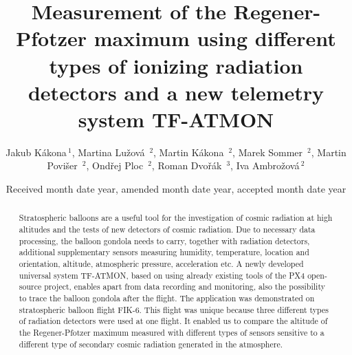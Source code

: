 \documentclass{Rpd}
\begin{document}

\def\copyrightyear{2021}%

\title[TF-ATMON ionizing radiation measurement]{Measurement of the Regener-Pfotzer maximum using different types of ionizing radiation detectors and a new telemetry system TF-ATMON}
\author[Kakona J. \textit{et~al}]{Jakub Kákona\,$^{ 1}$,  Martina Lužová \,$^{ 2}$, Martin Kákona \,$^{ 2}$, Marek Sommer \,$^{ 2}$, Martin Povišer \,$^{ 2}$, Ondřej Ploc \,$^{ 2}$, Roman Dvořák \,$^{ 3}$, Iva Ambrožová\,$^{ 2}$}
\address{$^{ 1}$Czech Technical University in Prague, Faculty of Electrical Engineering, Prague, Czech Republic \newline $^{ 2}$Department of Radiation Dosimetry, Nuclear Physics Institute of the CAS, Na Truhlářce 39/64, 180 00, Prague 8, Czech Republic \newline $^{ 3}$ ThunderFly s.r.o., U Jatek 19, Soběslav  392 01, Czech Republic \newline Corresponding author: kakonjak@fel.cvut.cz } 

\date{Received month date year, amended month date year, accepted month date year} %

\begin{abstract}
Stratospheric balloons are a useful tool for the investigation of cosmic radiation at high altitudes and the tests of new detectors of cosmic radiation. Due to necessary data processing, the balloon gondola needs to carry, together with radiation detectors, additional supplementary sensors measuring humidity, temperature, location and orientation, altitude, atmospheric pressure, acceleration etc. A newly developed universal system TF-ATMON, based on using already existing tools of the PX4 open-source project, enables apart from data recording and monitoring, also the possibility to trace the balloon gondola after the flight. The application was demonstrated on stratospheric balloon flight FIK-6. This flight was unique because three different types of radiation detectors were used at one flight. It enabled us to compare the altitude of the Regener-Pfotzer maximum measured with different types of sensors sensitive to a different type of secondary cosmic radiation generated in the atmosphere.
\end{abstract}

\maketitle
\end{document}
